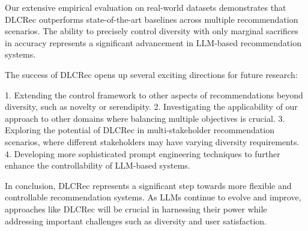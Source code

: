\documentclass[12pt,letterpaper]{article}
\begin{document}
Our extensive empirical evaluation on real-world datasets demonstrates that DLCRec outperforms state-of-the-art baselines across multiple recommendation scenarios. The ability to precisely control diversity with only marginal sacrifices in accuracy represents a significant advancement in LLM-based recommendation systems.

The success of DLCRec opens up several exciting directions for future research:

1. Extending the control framework to other aspects of recommendations beyond diversity, such as novelty or serendipity.
2. Investigating the applicability of our approach to other domains where balancing multiple objectives is crucial.
3. Exploring the potential of DLCRec in multi-stakeholder recommendation scenarios, where different stakeholders may have varying diversity requirements.
4. Developing more sophisticated prompt engineering techniques to further enhance the controllability of LLM-based systems.

In conclusion, DLCRec represents a significant step towards more flexible and controllable recommendation systems. As LLMs continue to evolve and improve, approaches like DLCRec will be crucial in harnessing their power while addressing important challenges such as diversity and user satisfaction.
\end{document}
